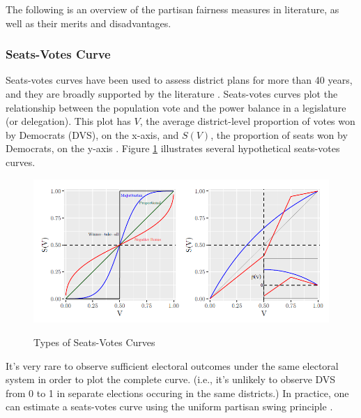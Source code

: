 The following is an overview of the partisan fairness measures in literature, as well as their merits and disadvantages. 

\subsubsection{Seats-Votes Curve}

Seats-votes curves have been used to assess district plans for more than 40 years, and they are broadly supported by the literature \parencite{katz2020}. Seats-votes curves plot the relationship between the population vote and the power balance in a legislature (or delegation). This plot has $V$, the average district-level proportion of votes won by Democrats (DVS), on the x-axis, and $S(V)$, the proportion of seats won by Democrats, on the y-axis \parencite{tufte1973}. Figure \ref{fig:seatsvotes} illustrates several hypothetical seats-votes curves.

\begin{figure}
    \centering
    \caption{Types of Seats-Votes Curves}
    \includegraphics[width=\linewidth]{img/seatsvotes.png}
    \label{fig:seatsvotes}
    \raggedright
\end{figure}

It's very rare to observe sufficient electoral outcomes under the same electoral system in order to plot the complete curve. (i.e., it's unlikely to observe DVS from 0 to 1 in separate elections occuring in the same districts.) In practice, one can estimate a seats-votes curve using the uniform partisan swing principle \parencite{tufte1973}.

